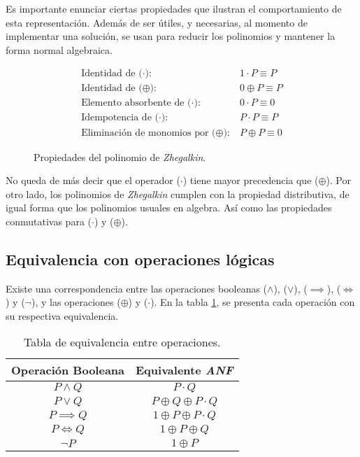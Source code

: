 Es importante enunciar ciertas propiedades que ilustran el comportamiento de esta representación\cite{zhegalkin}. Además de ser útiles, y necesarias, al momento de implementar una solución, se usan para reducir los polinomios y mantener la forma normal algebraica.

\begin{figure}
\begin{align*}
    \text{Identidad de ($\cdot$):}\ & 1 \cdot P \equiv P\\
    \text{Identidad de ($\oplus$):}\ & 0 \oplus P \equiv P\\
    \text{Elemento absorbente de ($\cdot$):}\ & 0 \cdot P \equiv 0\\
    \text{Idempotencia de ($\cdot$):}\ & P \cdot P \equiv P\\
    \text{Eliminación de monomios por ($\oplus$):}\ & P \oplus P \equiv 0
\end{align*}
\caption{Propiedades del polinomio de \textit{Zhegalkin}.}
\label{fig:properties}
\end{figure}

No queda de más decir que el operador ($\cdot$) tiene mayor precedencia que ($\oplus$). Por otro lado, los polinomios de \textit{Zhegalkin} cumplen con la propiedad distributiva, de igual forma que los polinomios usuales en algebra. Así como las propiedades conmutativas para ($\cdot$) y ($\oplus$).

\subsection{Equivalencia con operaciones lógicas}

Existe una correspondencia entre las operaciones booleanas ($\land$), ($\lor$), ($\implies$), ($\iff$) y ($\neg$), y las operaciones ($\oplus$) y ($\cdot$). En la tabla \ref{table:1}, se presenta cada operación con su respectiva equivalencia.

\begin{table}
\centering
\begin{tabular}{|| c | c ||}
 \hline
 Operación Booleana & Equivalente \textit{ANF} \\ [0.1ex]
 \hline\hline
 $P \land Q$ & $P\cdot Q$  \\
 $P \lor Q$ & $P\oplus Q\oplus P\cdot Q$  \\
 $P \implies Q$ & $1\oplus P\oplus P\cdot Q$  \\
 $P \iff Q$ & $1\oplus P\oplus Q$  \\
 $\neg P$ & $1\oplus P$  \\
 \hline
\end{tabular}
\caption{Tabla de equivalencia entre operaciones.}
\label{table:1}
\end{table}

